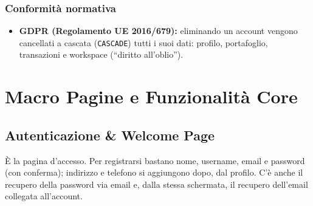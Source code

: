 \subsubsection{Conformità normativa}
\begin{itemize}
    \item \textbf{GDPR (Regolamento UE 2016/679):} eliminando un account vengono cancellati a cascata (\texttt{CASCADE}) tutti i suoi dati: profilo, portafoglio, transazioni e workspace (``diritto all'oblio'').
\end{itemize}

\section{Macro Pagine e Funzionalità Core}

\subsection{Autenticazione \& Welcome Page}
È la pagina d'accesso. Per registrarsi bastano nome, username, email e password (con conferma); indirizzo e telefono si aggiungono dopo, dal profilo. C'è anche il recupero della password via email e, dalla stessa schermata, il recupero dell'email collegata all'account.

